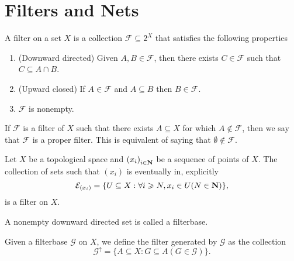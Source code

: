 \section{Filters and Nets}

\begin{definition}\label{def: filter}
  A filter on a set \(X\) is a collection \(\mathcal F \subseteq 2^X\) that
  satisfies the following properties
  \begin{enumerate}[(F1)]
    \item\label{def: filter F1}
      (Downward directed) Given \(A, B \in \mathcal F\), then there exists
      \(C \in \mathcal F\) such that \(C \subseteq A \cap B\).
    \item\label{def: filter F2}
      (Upward closed) If \(A \in \mathcal F\) and \(A \subseteq B\) then \(B
      \in \mathcal F\).
    \item\label{def: filter F3}
      \(\mathcal F\) is nonempty.
  \end{enumerate}
\end{definition}

\begin{definition}
  If \(\mathcal F\) is a filter of \(X\) such that there exists \(A \subseteq
  X\) for which \(A \not\in \mathcal F\), then we say that \(\mathcal F\) is a
  proper filter. This is equivalent of saying that \(\emptyset \not\in \mathcal
  F\).
\end{definition}

\begin{proposition}
  Let \(X\) be a topological space and \({(x_i)}_{i \in \mathbf{N}}\) be a
  sequence of points of \(X\). The collection of sets such that \((x_i)\) is
  eventually in, explicitly
  \[
    \mathcal E_{(x_i)} = \{U \subseteq X : \forall i \geqslant N, x_i \in U (N \in
    \mathbf{N})\},
  \]
  is a filter on \(X\).
\end{proposition}

\begin{definition}[Filterbase]
  A nonempty downward directed set is called a filterbase.
\end{definition}

\begin{proposition}
  Given a filterbase \(\mathcal G\) on \(X\), we define the filter generated by
  \(\mathcal G\) as the collection
  \[
    \mathcal G^\uparrow = \{A \subseteq X : G \subseteq A (G \in \mathcal G)\}.
  \]
\end{proposition}

